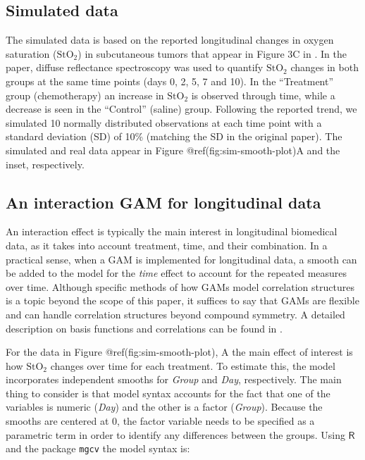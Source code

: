 \documentclass[Royal,times,sagev]{sagej}
\begin{document}
\hypertarget{simulated-data}{%
\subsection{Simulated data}\label{simulated-data}}

The simulated data is based on the reported longitudinal changes in
oxygen saturation (\(\mbox{StO}_2\)) in subcutaneous tumors that appear
in Figure 3C in \citep{vishwanath2009}. In the paper, diffuse
reflectance spectroscopy was used to quantify \(\mbox{StO}_2\) changes
in both groups at the same time points (days 0, 2, 5, 7 and 10). In the
``Treatment'' group (chemotherapy) an increase in \(\mbox{StO}_2\) is
observed through time, while a decrease is seen in the ``Control''
(saline) group. Following the reported trend, we simulated 10 normally
distributed observations at each time point with a standard deviation
(SD) of 10\% (matching the SD in the original paper). The simulated and
real data appear in Figure @ref(fig:sim-smooth-plot)A and the inset,
respectively.

\hypertarget{an-interaction-gam-for-longitudinal-data}{%
\subsection{An interaction GAM for longitudinal
data}\label{an-interaction-gam-for-longitudinal-data}}

An interaction effect is typically the main interest in longitudinal
biomedical data, as it takes into account treatment, time, and their
combination. In a practical sense, when a GAM is implemented for
longitudinal data, a smooth can be added to the model for the
\emph{time} effect to account for the repeated measures over time.
Although specific methods of how GAMs model correlation structures is a
topic beyond the scope of this paper, it suffices to say that GAMs are
flexible and can handle correlation structures beyond compound symmetry.
A detailed description on basis functions and correlations can be found
in \citep{hefley2017}.

For the data in Figure @ref(fig:sim-smooth-plot), A the main effect of
interest is how \(\mbox{StO}_2\) changes over time for each treatment.
To estimate this, the model incorporates independent smooths for
\emph{Group} and \emph{Day}, respectively. The main thing to consider is
that model syntax accounts for the fact that one of the variables is
numeric (\emph{Day}) and the other is a factor (\emph{Group}). Because
the smooths are centered at 0, the factor variable needs to be specified
as a parametric term in order to identify any differences between the
groups. Using \(\textsf{R}\) and the package \texttt{mgcv} the model
syntax is:
\end{document}
